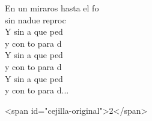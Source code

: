 \begin{cancion}
\begin{chorus}
		En un miraros hasta el fo \\
		sin nadue reproc\\
		Y sin a que ped\\
		y con to para d\\
		Y sin a que ped\\
		y con to para d\\
		Y sin a que ped\\
		y con to para d...\jump\\
	\end{chorus}%
<span id="cejilla-original">2</span>\\
\end{cancion}%

